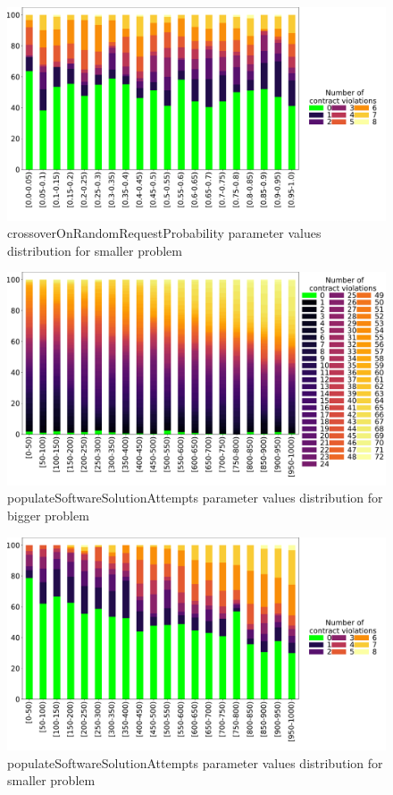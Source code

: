 \begin{figure}
	\centering
	\includegraphics[width=\textwidth]{images/DistrValiditySmall/crossoverOnRandomRequestProbability.pdf}
	\caption[]{crossoverOnRandomRequestProbability parameter values distribution for smaller problem}       
	\label{fig:crossoverOnRandomRequestProbability_DistSmall}
\end{figure}

\begin{figure}
	\centering
	\includegraphics[width=\textwidth]{images/DistrValidityBig/populateSoftwareSolutionAttempts.pdf}
	\caption[]{populateSoftwareSolutionAttempts parameter values distribution for bigger problem}
	\label{fig:populateSoftwareSolutionAttempts_DistBig}
\end{figure}
\begin{figure}
	\centering
	\includegraphics[width=\textwidth]{images/DistrValiditySmall/populateSoftwareSolutionAttempts.pdf}
	\caption[]{populateSoftwareSolutionAttempts parameter values distribution for smaller problem}
	\label{fig:populateSoftwareSolutionAttempts_DistSmall}
\end{figure}